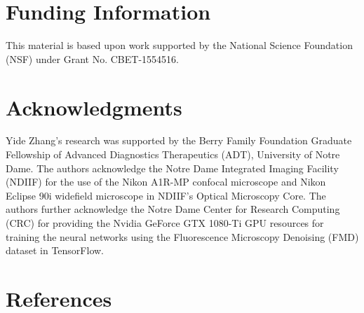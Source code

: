 \documentclass[12pt]{iopart}
\begin{document}
\section*{Funding Information}
This material is based upon work supported by the National Science Foundation (NSF) under Grant No. CBET-1554516.

\section*{Acknowledgments}
Yide Zhang’s research was supported by the Berry Family Foundation Graduate Fellowship of Advanced Diagnostics  Therapeutics (ADT), University of Notre Dame. The authors acknowledge the Notre Dame Integrated Imaging Facility (NDIIF) for the use of the Nikon A1R-MP confocal microscope and Nikon Eclipse 90i widefield microscope in NDIIF’s Optical Microscopy Core. The authors further acknowledge the Notre Dame Center for Research Computing (CRC) for providing the Nvidia GeForce GTX 1080-Ti GPU resources for training the neural networks using the Fluorescence Microscopy Denoising (FMD) dataset in TensorFlow.

\section*{References}


\end{document}
